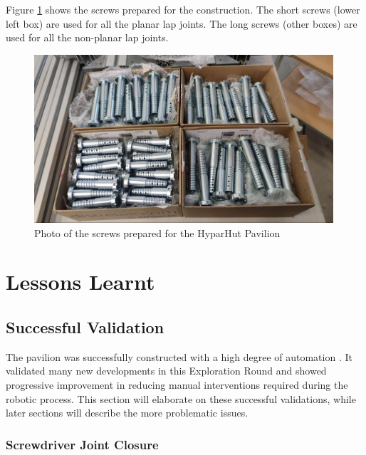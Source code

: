 Figure \ref{fig:screws-hyparhut-pavilion} shows the screws prepared for the construction. The short screws (lower left box) are used for all the planar lap joints. The long screws (other boxes) are used for all the non-planar lap joints.

\begin{figure}[!h]
    \centering
    \includegraphics[width=0.99\textwidth]{images/7b/img20.jpg}
    \caption{Photo of the screws prepared for the HyparHut Pavilion}
    \label{fig:screws-hyparhut-pavilion}
\end{figure}

\section{Lessons Learnt}
\label{section:exploration-4-lessons-learnt}

\subsection{Successful Validation}
\label{subsection:exploration-4-successful-validation}

The pavilion was successfully constructed with a high degree of automation . It validated many new developments in this Exploration Round and showed progressive improvement in reducing manual interventions required during the robotic process. This section will elaborate on these successful validations, while later sections will describe the more problematic issues.

\subsubsection{Screwdriver Joint Closure}
\label{subsubsection:exploration-4-screwdriver-joint-closure}

